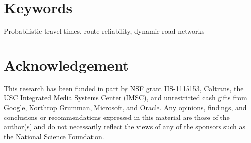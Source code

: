 \documentclass[]{sig-alternate}
\begin{document}
\section*{Keywords}
\vspace{-0.025in}
Probabilistic travel times, route reliability, dynamic road networks











\vspace{-0.1in}
\section*{Acknowledgement}
This research has been funded in part by NSF grant IIS-1115153, Caltrans, the USC Integrated Media Systems Center (IMSC), and unrestricted cash gifts from Google, Northrop Grumman, Microsoft, and Oracle. Any opinions, findings, and conclusions or recommendations expressed in this material are those of the author(s) and do not necessarily reflect the views of any of the sponsors such as the National Science Foundation.

\begin{scriptsize}


\end{scriptsize}
\end{document}
